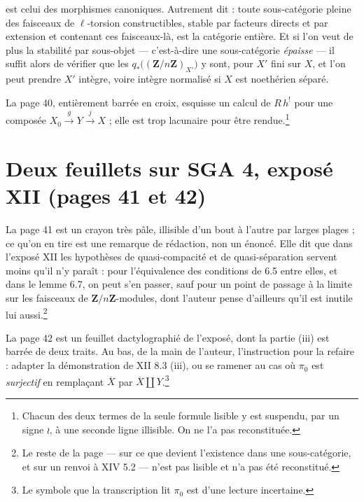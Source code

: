 \documentclass[11pt,a4paper]{article}
\begin{document}

est celui des morphismes canoniques. Autrement dit : toute sous-catégorie
pleine des faisceaux de $\ell$-torsion constructibles, stable par facteurs
directs et par extension et contenant ces faisceaux-là, est la catégorie
entière. Et si l'on veut de plus la stabilité par sous-objet — c'est-à-dire une
sous-catégorie \emph{épaisse} — il suffit alors de vérifier que les
$q_{*}\bigl( (\mathbf{Z}/n\mathbf{Z})_{X'} \bigr)$ y sont, pour $X'$ fini sur
$X$, et l'on peut prendre $X'$ intègre, voire intègre normalisé si $X$ est
noethérien séparé.

La page 40, entièrement barrée en croix, esquisse un calcul de $R\,h^{!}$ pour
une composée $X_{0} \xrightarrow{g} Y \xrightarrow{j} X$ ; elle est trop
lacunaire pour être rendue.\footnote{Chacun des deux termes de la seule formule
lisible y est suspendu, par un signe $\wr$, à une seconde ligne illisible. On
ne l'a pas reconstituée.}

\section*{Deux feuillets sur SGA 4, exposé XII (pages 41 et 42)}

La page 41 est un crayon très pâle, illisible d'un bout à l'autre par larges
plages ; ce qu'on en tire est une remarque de rédaction, non un énoncé. Elle
dit que dans l'exposé XII les hypothèses de quasi-compacité et de
quasi-séparation servent moins qu'il n'y paraît : pour l'équivalence des
conditions de 6.5 entre elles, et dans le lemme 6.7, on peut s'en passer,
sauf pour un point de passage à la limite sur les faisceaux de
$\mathbf{Z}/n\mathbf{Z}$-modules, dont l'auteur pense d'ailleurs qu'il est
inutile lui aussi.\footnote{Le reste de la page — sur ce que devient
l'existence dans une sous-catégorie, et sur un renvoi à XIV 5.2 — n'est pas
lisible et n'a pas été reconstitué.}

La page 42 est un feuillet dactylographié de l'exposé, dont la partie (iii) est
barrée de deux traits. Au bas, de la main de l'auteur, l'instruction pour la
refaire : adapter la démonstration de XII 8.3 (iii), ou se ramener au cas où
$\pi_{0}$ est \emph{surjectif} en remplaçant $\overline{X}$ par
$\overline{X} \amalg Y$.\footnote{Le symbole que la transcription lit
$\pi_{0}$ est d'une lecture incertaine.}
\end{document}
